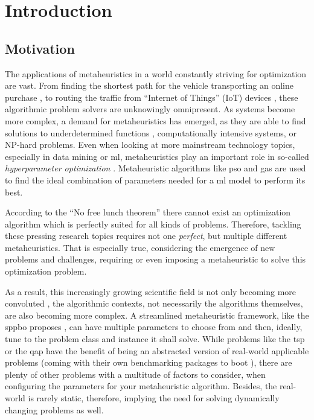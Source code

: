 
\chapter{Introduction}
\label{chap:introduction}

\section{Motivation}

The applications of metaheuristics in a world constantly striving for optimization are vast. From finding the shortest path for the vehicle transporting an online purchase \cite{vogel2011flexible}, to routing the traffic from \enquote{Internet of Things} (IoT) devices \cite{sharma2022systematic}, these algorithmic problem solvers are unknowingly omnipresent. As systems become more complex, a demand for metaheuristics has emerged, as they are able to find solutions to underdetermined functions \cite{jamisola2009using}, computationally intensive systems, or NP-hard problems. Even when looking at more mainstream technology topics, especially in data mining or \gls{ml}, metaheuristics play an important role in so-called \textit{hyperparameter optimization} \cite{yang2020hyperparameter}. Metaheuristic algorithms like \gls{pso} and \glspl{ga} are used to find the ideal combination of parameters needed for a \gls{ml} model to perform its best.

According to the \enquote{No free lunch theorem} \cite{wolpert1997no} there cannot exist an optimization algorithm which is perfectly suited for all kinds of problems. Therefore, tackling these pressing research topics requires not one \textit{perfect}, but multiple different metaheuristics. That is especially true, considering the emergence of new problems and challenges, requiring or even imposing a metaheuristic to solve this optimization problem.

 As a result, this increasingly growing scientific field is not only becoming more convoluted \cite{sorensen2018history}, the algorithmic contexts, not necessarily the algorithms themselves, are also becoming more complex. A streamlined metaheuristic framework, like the \gls{sppbo} proposes \cite{lin2015simple}, can have multiple parameters to choose from and then, ideally, tune to the problem class and instance it shall solve. While problems like the \gls{tsp} or the \gls{qap} have the benefit of being an abstracted version of real-world applicable problems (coming with their own benchmarking packages to boot \cite{reinelt1991tsplib, burkard1997qaplib}), there are plenty of other problems with a multitude of factors to consider, when configuring the parameters for your metaheuristic algorithm. Besides, the real-world is rarely static, therefore, implying the need for solving dynamically changing problems as well.


